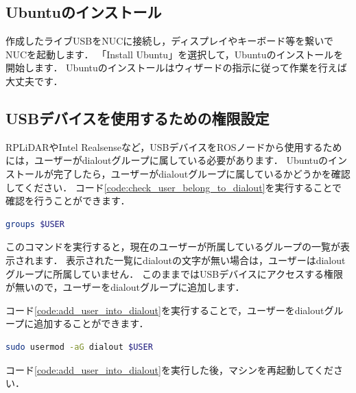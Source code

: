 \documentclass[{../../master}]{subfiles}
\begin{document}
\subsection{Ubuntuのインストール}

作成したライブUSBをNUCに接続し，ディスプレイやキーボード等を繋いでNUCを起動します．
「Install Ubuntu」を選択して，Ubuntuのインストールを開始します．
Ubuntuのインストールはウィザードの指示に従って作業を行えば大丈夫です．

\subsection{USBデバイスを使用するための権限設定}

RPLiDARやIntel Realsenseなど，USBデバイスをROSノードから使用するためには，ユーザーが\textsf{dialout}グループに属している必要があります．
Ubuntuのインストールが完了したら，ユーザーが\textsf{dialout}グループに属しているかどうかを確認してください．
コード\ref{code:check_user_belong_to_dialout}を実行することで確認を行うことができます．

\begin{lstlisting}[language=sh, label=code:check_user_belong_to_dialout, caption=Check if the User Belongs to the \textsf{dialout} Group]
groups $USER
\end{lstlisting}

このコマンドを実行すると，現在のユーザーが所属しているグループの一覧が表示されます．
表示された一覧に\textsf{dialout}の文字が無い場合は，ユーザーは\textsf{dialout}グループに所属していません．
このままではUSBデバイスにアクセスする権限が無いので，ユーザーを\textsf{dialout}グループに追加します．

コード\ref{code:add_user_into_dialout}を実行することで，ユーザーを\textsf{dialout}グループに追加することができます．

\begin{lstlisting}[language=sh, label=code:add_user_into_dialout, caption=Add the User into \textsf{dialout} Group]
sudo usermod -aG dialout $USER
\end{lstlisting}

コード\ref{code:add_user_into_dialout}を実行した後，マシンを再起動してください．
\end{document}
